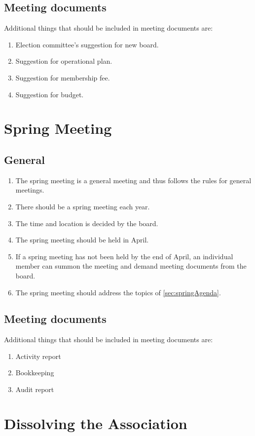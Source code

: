 \subsection{Meeting documents}
Additional things that should be included in meeting documents are:
\begin{enumerate}
  \item Election committee’s suggestion for new board.
  \item Suggestion for operational plan.
  \item Suggestion for membership fee.
  \item Suggestion for budget. 
\end{enumerate}

\section*{Spring Meeting}
\subsection{General}
\begin{enumerate}
  \item The spring meeting is a general meeting and thus follows the rules for general meetings.
  \item There should be a spring meeting each year.
  \item The time and location is decided by the board.
  \item The spring meeting should be held in April.
  \item If a spring meeting has not been held by the end of April, an individual member can summon the meeting and demand meeting documents from the board.
  \item The spring meeting should address the topics of \ref{sec:springAgenda}.
\end{enumerate}

\subsection{Meeting documents}
Additional things that should be included in meeting documents are:
\begin{enumerate}
  \item Activity report
  \item Bookkeeping
  \item Audit report
\end{enumerate}

\section*{Dissolving the Association}
